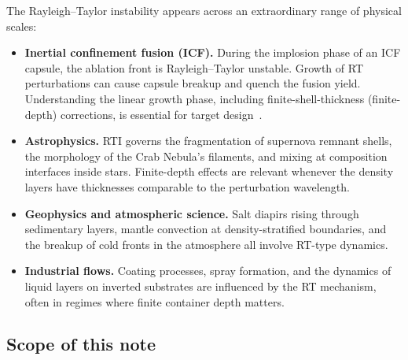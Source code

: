 \documentclass[11pt,a4paper]{article}
\begin{document}
The Rayleigh--Taylor instability appears across an extraordinary range of physical scales:
\begin{itemize}[leftmargin=*]
    \item \textbf{Inertial confinement fusion (ICF).}  During the implosion phase of an ICF capsule, the ablation front is Rayleigh--Taylor unstable.  Growth of RT perturbations can cause capsule breakup and quench the fusion yield.  Understanding the linear growth phase, including finite-shell-thickness (finite-depth) corrections, is essential for target design~\cite{sharp1984}.

    \item \textbf{Astrophysics.}  RTI governs the fragmentation of supernova remnant shells, the morphology of the Crab Nebula's filaments, and mixing at composition interfaces inside stars.  Finite-depth effects are relevant whenever the density layers have thicknesses comparable to the perturbation wavelength.

    \item \textbf{Geophysics and atmospheric science.}  Salt diapirs rising through sedimentary layers, mantle convection at density-stratified boundaries, and the breakup of cold fronts in the atmosphere all involve RT-type dynamics.

    \item \textbf{Industrial flows.}  Coating processes, spray formation, and the dynamics of liquid layers on inverted substrates are influenced by the RT mechanism, often in regimes where finite container depth matters.
\end{itemize}

\subsection{Scope of this note}
\end{document}
